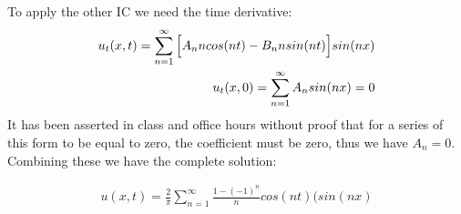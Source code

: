 \documentclass{article}
\begin{document}
To apply the other IC we need the time derivative:
\begin{equation}
\begin{aligned}
u_t(x,t) = \sum_{n=1}^{\infty}\Big{[}A_nncos(nt) - B_nnsin(nt)\Big{]}sin(nx)\\
u_t(x,0) =\sum_{n=1}^{\infty} A_nsin(nx) = 0
\end{aligned}
\end{equation}
It has been asserted in class and office hours without proof that for a series of this form to be equal to zero, the coefficient must be zero, thus we have $A_n = 0$. Combining these we have the complete solution:
\begin{tcolorbox}[minipage,colback=white,arc=0pt,outer arc=0pt]
\begin{equation}
\begin{aligned}
u(x,t) = \frac{2}{\pi}\sum_{n=1}^{\infty}\frac{1 -(-1)^n}{n}cos(nt)(sin(nx)\\
\end{aligned}
\end{equation}
\end{tcolorbox}
\end{document}
